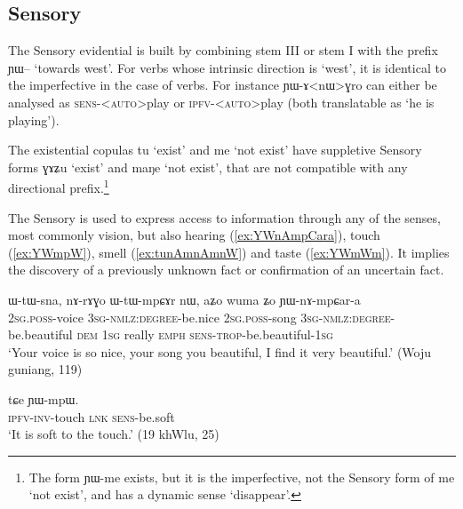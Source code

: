 \documentclass[oldfontcommands,oneside,a4paper,11pt]{article}
\newcommand{\ipa}[1]{{\phon \mbox{#1}}} %
\begin{document}
 \subsection{Sensory } \label{sec:sens}
The Sensory evidential is built by combining stem III or stem I with the prefix \ipa{ɲɯ--} `towards west'.  For verbs whose intrinsic direction is `west', it is identical to the imperfective in the case of verbs. For instance \ipa{ɲɯ-ɤ<nɯ>ɣro} can either be analysed as \textsc{sens-<auto>}play or \textsc{ipfv-<auto>}play (both translatable as `he is playing').

The existential copulas \ipa{tu} `exist' and \ipa{me} `not exist' have suppletive Sensory forms \ipa{ɣɤʑu} `exist'  and \ipa{maŋe} `not exist', that are not compatible with any directional prefix.\footnote{The form \ipa{ɲɯ-me} exists, but it is the imperfective, not the Sensory form of \ipa{me} `not exist', and has a dynamic sense `disappear'. }

The Sensory is used to express access to information through any of the senses, most commonly vision, but also hearing (\ref{ex:YWnAmpCara}), touch (\ref{ex:YWmpW}), smell (\ref{ex:tunAmnAmnW}) and taste (\ref{ex:YWmWm}). It implies the discovery of a previously unknown fact or confirmation of an uncertain fact.

\begin{exe}
\ex \label{ex:YWnAmpCara}
\gll \ipa{nɤ-skɤt} 	\ipa{ɯ-tɯ-sna,} 	\ipa{nɤ-rɤɣo} 	\ipa{ɯ-tɯ-mpɕɤr} 	\ipa{nɯ,} 	\ipa{aʑo} 	\ipa{wuma} 	\ipa{ʑo} 	\ipa{ɲɯ-nɤ-mpɕar-a} \\
\textsc{2sg.poss}-voice \textsc{3sg-nmlz:degree}-be.nice \textsc{2sg.poss}-song \textsc{3sg-nmlz:degree}-be.beautiful \textsc{dem} \textsc{1sg} really \textsc{emph} \textsc{sens-trop}-be.beautiful-\textsc{1sg} \\
\glt `Your voice is so nice, your song you beautiful, I find it very beautiful.' (Woju guniang, 119)
\end{exe}
 
\begin{exe}
\ex \label{ex:YWmpW}
\gll \ipa{ɲɯ́-wɣ-nɤmɤle} 	\ipa{tɕe} 	\ipa{ɲɯ-mpɯ.} \\
\textsc{ipfv-inv}-touch \textsc{lnk} \textsc{sens}-be.soft \\
\glt `It is soft to the touch.' (19 khWlu, 25)
\end{exe}
\end{document}

